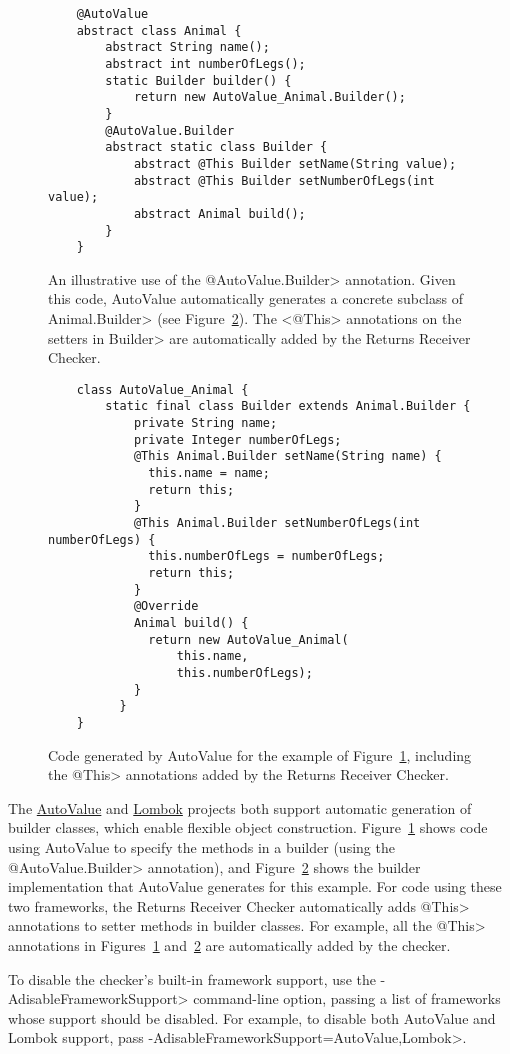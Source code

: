 
\begin{figure}
    \begin{Verbatim}
    @AutoValue
    abstract class Animal {
        abstract String name();
        abstract int numberOfLegs();
        static Builder builder() {
            return new AutoValue_Animal.Builder();
        }
        @AutoValue.Builder
        abstract static class Builder {
            abstract @This Builder setName(String value);
            abstract @This Builder setNumberOfLegs(int value);
            abstract Animal build();
        }
    }
    \end{Verbatim}
    \caption{An illustrative use of the \<@AutoValue.Builder> annotation.
    Given this code, AutoValue automatically generates a concrete subclass of
    \<Animal.Builder> (see Figure~\ref{fig-autovalue-builder-generated}).  The <@This> annotations on the setters in
    \<Builder> are automatically added by the Returns Receiver Checker.}
    \label{fig-autovalue-builder}
\end{figure}

\begin{figure}
    \begin{Verbatim}
    class AutoValue_Animal {
        static final class Builder extends Animal.Builder {
            private String name;
            private Integer numberOfLegs;
            @This Animal.Builder setName(String name) {
              this.name = name;
              return this;
            }
            @This Animal.Builder setNumberOfLegs(int numberOfLegs) {
              this.numberOfLegs = numberOfLegs;
              return this;
            }
            @Override
            Animal build() {
              return new AutoValue_Animal(
                  this.name,
                  this.numberOfLegs);
            }
          }
    }
    \end{Verbatim}
    \caption{Code generated by AutoValue for the example of
    Figure~\ref{fig-autovalue-builder}, including the \<@This> annotations added
    by the Returns Receiver Checker.}
    \label{fig-autovalue-builder-generated}
\end{figure}

The \href{https://github.com/google/auto/tree/master/value}{AutoValue} and
\href{https://projectlombok.org/}{Lombok} projects both support automatic
generation of builder classes, which enable flexible object construction.
Figure~\ref{fig-autovalue-builder} shows code using AutoValue to specify the
methods in a builder (using the \<@AutoValue.Builder> annotation), and
Figure~\ref{fig-autovalue-builder-generated} shows the builder implementation
that AutoValue generates for this example.  For code using these two frameworks,
the Returns Receiver Checker automatically adds \<@This> annotations to setter
methods in builder classes.  For example, all the \<@This> annotations in
Figures~\ref{fig-autovalue-builder} and~\ref{fig-autovalue-builder-generated}
are automatically added by the checker.

To disable the checker's built-in framework support, use the
\<-AdisableFrameworkSupport> command-line option, passing a list of frameworks
whose support should be disabled.  For example, to disable both AutoValue and
Lombok support, pass \<-AdisableFrameworkSupport=AutoValue,Lombok>.
